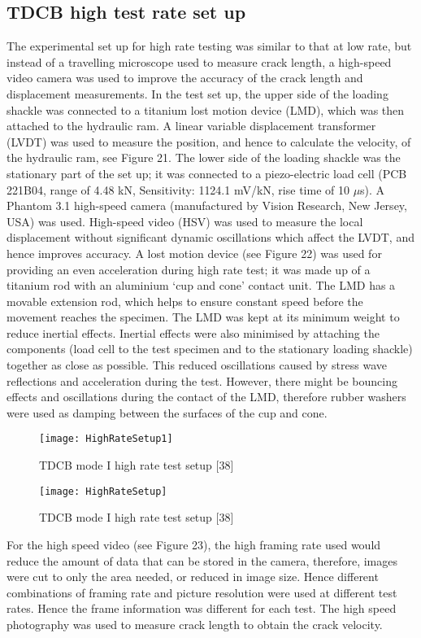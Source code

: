 \documentclass[numbers=noendperiod,chapterprefix=on]{icldt} %
\begin{document}
\subsection{TDCB high test rate set up}
The experimental set up for high rate testing was similar to that at low rate, but instead of a travelling microscope used to measure crack length, a high-speed video camera was used to improve the accuracy of the crack length and displacement measurements. 
In the test set up, the upper side of the loading shackle was connected to a titanium lost motion device (LMD), which was then attached to the hydraulic ram. A linear variable displacement transformer (LVDT) was used to measure the position, and hence to calculate the velocity, of the hydraulic ram, see Figure 21. 
The lower side of the loading shackle was the stationary part of the set up; it was connected to a piezo-electric load cell (PCB 221B04, range of 4.48 kN, Sensitivity: 1124.1 mV/kN, rise time of 10 $\mu$s). A Phantom 3.1 high-speed camera (manufactured by Vision Research, New Jersey, USA) was used. High-speed video (HSV) was used to measure the local displacement without significant dynamic oscillations which affect the LVDT, and hence improves accuracy.
A lost motion device (see Figure 22) was used for providing an even acceleration during high rate test; it was made up of a titanium rod with an aluminium ‘cup and cone’ contact unit. The LMD has a movable extension rod, which helps to ensure constant speed before the movement reaches the specimen. The LMD was kept at its minimum weight to reduce inertial effects. Inertial effects were also minimised by attaching the components (load cell to the test specimen and to the stationary loading shackle) together as close as possible. This reduced oscillations caused by stress wave reflections and acceleration during the test. However, there might be bouncing effects and oscillations during the contact of the LMD, therefore rubber washers were used as damping between the surfaces of the cup and cone.

\begin{figure}[!htpb]
\centering
\texttt{[image: HighRateSetup1]}
\caption{TDCB mode I high rate test setup [38]} %
\end{figure}
\FloatBarrier
\begin{figure}[!htpb]
\centering
\texttt{[image: HighRateSetup]}
\caption{TDCB mode I high rate test setup [38]} %
\end{figure}
\FloatBarrier
For the high speed video (see Figure 23), the high framing rate used would reduce the amount of data that can be stored in the camera, therefore, images were cut to only the area needed, or reduced in image size. Hence different combinations of framing rate and picture resolution were used at different test rates. Hence the frame information was different for each test. The high speed photography was used to measure crack length to obtain the crack velocity.
\end{document}
